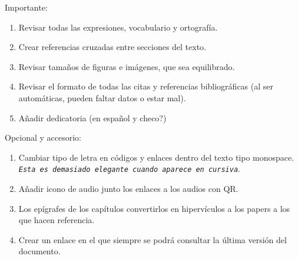 Importante:
  \begin{enumerate}
    \item Revisar todas las expresiones, vocabulario y ortografía.
    \item Crear referencias cruzadas entre secciones del texto.
    \item Revisar tamaños de figuras e imágenes, que sea equilibrado.
    \item Revisar el formato de todas las citas y referencias bibliográficas (al ser automáticas, pueden faltar datos o estar mal).
    \item Añadir dedicatoria (en español y checo?) %
  \end{enumerate}

  
  Opcional y accesorio:
  \begin{enumerate}
    \item Cambiar tipo de letra en códigos y enlaces dentro del texto tipo monospace. \texttt{\textit{Esta es demasiado elegante cuando aparece en cursiva}}.
    \item Añadir icono de audio junto los enlaces a los audios con QR.
    \item Los epígrafes de los capítulos convertirlos en hipervículos a los papers a los que hacen referencia.
    \item Crear un enlace en el que siempre se podrá consultar la última versión del documento.
  \end{enumerate}



